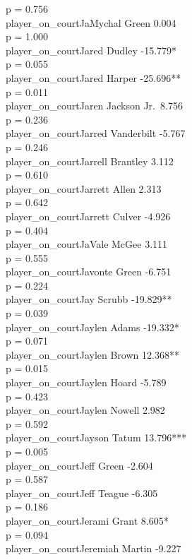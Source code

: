 \documentclass[
  landscape]{article}
\begin{document}
p = 0.756\\
player\_on\_courtJaMychal Green 0.004\\
p = 1.000\\
player\_on\_courtJared Dudley -15.779*\\
p = 0.055\\
player\_on\_courtJared Harper -25.696**\\
p = 0.011\\
player\_on\_courtJaren Jackson Jr.~8.756\\
p = 0.236\\
player\_on\_courtJarred Vanderbilt -5.767\\
p = 0.246\\
player\_on\_courtJarrell Brantley 3.112\\
p = 0.610\\
player\_on\_courtJarrett Allen 2.313\\
p = 0.642\\
player\_on\_courtJarrett Culver -4.926\\
p = 0.404\\
player\_on\_courtJaVale McGee 3.111\\
p = 0.555\\
player\_on\_courtJavonte Green -6.751\\
p = 0.224\\
player\_on\_courtJay Scrubb -19.829**\\
p = 0.039\\
player\_on\_courtJaylen Adams -19.332*\\
p = 0.071\\
player\_on\_courtJaylen Brown 12.368**\\
p = 0.015\\
player\_on\_courtJaylen Hoard -5.789\\
p = 0.423\\
player\_on\_courtJaylen Nowell 2.982\\
p = 0.592\\
player\_on\_courtJayson Tatum 13.796***\\
p = 0.005\\
player\_on\_courtJeff Green -2.604\\
p = 0.587\\
player\_on\_courtJeff Teague -6.305\\
p = 0.186\\
player\_on\_courtJerami Grant 8.605*\\
p = 0.094\\
player\_on\_courtJeremiah Martin -9.227\\
\end{document}
